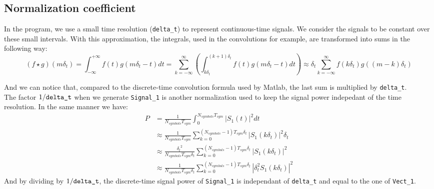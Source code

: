\documentclass[a4paper]{article}
\begin{document}
\subsection{Normalization coefficient}
In the program, we use a small time resolution (\verb|delta_t|) to represent continuous-time signals. We consider the signals to be constant over these small intervals. With this approximation, the integrals, used in the convolutions for example, are transformed into sums in the following way:
\begin{equation*}
(f\star g)(m\delta_{t}) = \int_{-\infty}^{+\infty} f(t)g(m\delta_{t}-t) dt = \sum_{k=-\infty}^{\infty}\left(\int_{k\delta_{t}}^{(k+1)\delta_{t}} f(t)g(m\delta_{t}-t) dt \right) \approx \delta_{t}\sum_{k=-\infty}^{\infty}f(k\delta_{t})g((m-k)\delta_{t})
\end{equation*}

And we can notice that, compared to the discrete-time convolution formula used by Matlab, the last sum is multiplied by \verb|delta_t|.\\

The factor $1/\verb|delta_t|$ when we generate \verb|Signal_1| is another normalization used to keep the signal power indepedant of the time resolution. In the same manner we have:
\begin{align*}
P &=\frac{1}{N_{symbols}T_{sym}}\int_{0}^{N_{symbols}T_{sym}}|S_{1}(t)|^{2}dt\\
&\approx \frac{1}{N_{symbols}T_{sym}}\sum_{k=0}^{(N_{symbols}-1)T_{sym}\delta_t}|S_{1}(k\delta_t)|^{2}\delta_t\\ &\approx\frac{{\delta_t}^2}{N_{symbols}T_{sym}\delta_t}\sum_{k=0}^{(N_{symbols}-1)T_{sym}\delta_t}|S_{1}(k\delta_t)|^{2}\\
&\approx\frac{1}{N_{symbols}T_{sym}\delta_t}\sum_{k=0}^{(N_{symbols}-1)T_{sym}\delta_t}|\delta_t^2S_{1}(k\delta_t)|^{2} 
\end{align*}
And by dividing by $1/\verb|delta_t|$, the discrete-time signal power of \verb|Signal_1| is independant of \verb|delta_t| and equal to the one of \verb|Vect_1|.

\end{document}
